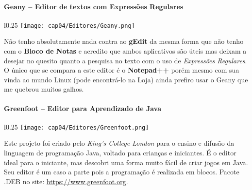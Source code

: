 \paragraph{Geany – Editor de textos com Expressões Regulares}
\begin{minipage}{\linewidth}
 \vspace{5pt}
 \begin{wrapfigure}{l}{0.25\textwidth}
  \vspace{-\baselineskip}
  \texttt{[image: cap04/Editores/Geany.png]} 
 \end{wrapfigure}
 Não tenho absolutamente nada contra ao \textbf{gEdit} da mesma forma que não tenho com o \textbf{Bloco de Notas} e acredito que ambos aplicativos são úteis mas deixam a desejar no quesito quanto a pesquisa no texto com o uso de \textit{Expressões Regulares}. O único que se compara a este editor é o \textbf{Notepad++} porém mesmo com sua vinda ao mundo Linux (pode encontrá-lo na Loja) ainda prefiro usar o Geany que me quebrou muitos galhos.
\end{minipage}

\paragraph{Greenfoot – Editor para Aprendizado de Java}
\begin{minipage}{\linewidth}
 \vspace{5pt}
 \begin{wrapfigure}{l}{0.25\textwidth}
  \vspace{-\baselineskip}
  \texttt{[image: cap04/Editores/Greenfoot.png]} 
 \end{wrapfigure}
 Este projeto foi criado pelo \textit{King's College London} para o ensino e difusão da linguagem de programação Java, voltado para crianças e iniciantes. É o editor ideal para o iniciante, mas descobri uma forma muito fácil de criar jogos em Java. Seu editor é um caso a parte pois a programação é realizada em blocos. Pacote .DEB no site: \url{https://www.greenfoot.org}.
\end{minipage}

